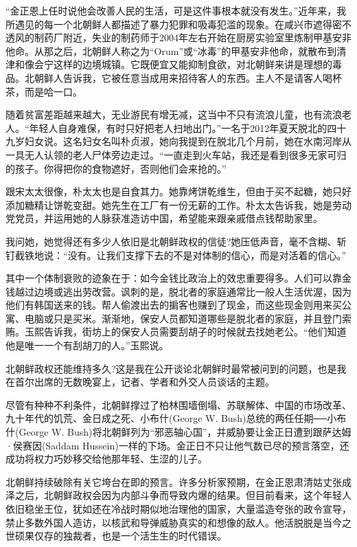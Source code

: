 “金正恩上任时说他会改善人民的生活，可是这件事根本就没有发生。”近年来，我所遇见的每一个北朝鲜人都描述了暴力犯罪和吸毒犯滥的现象。在咸兴市遮得密不透风的制药厂附近，失业的制药师于2004年左右开始在厨房实验室里炼制甲基安非他命。从那之后，北朝鲜人称之为“Orum”或“冰毒”的甲基安非他命，就散布到清津和像会宁这样的边境城镇。它既便宜又能抑制食欲，对北朝鲜来讲是理想的毒品。北朝鲜人告诉我，它被任意当成用来招待客人的东西。主人不是请客人喝杯茶，而是哈一口。

随着贫富差距越来越大，无业游民有增无减，这当中不只有流浪儿童，也有流浪老人。“年轻人自身难保，有时只好把老人扫地出门。”一名于2012年夏天脱北的四十九岁妇女说。这名妇女名叫朴贞淑，她向我提到在脱北几个月前，她在水南河岸从一具无人认领的老人尸体旁边走过。“一直走到火车站，我还是看到很多无家可归的孩子。你得把你的食物遮好，否则他们会来抢的。”

跟宋太太很像，朴太太也是自食其力。她靠烤饼乾维生，但由于买不起糖，她只好添加糖精让饼乾变甜。她先生在工厂有一份无薪的工作。朴太太告诉我，她是劳动党党员，并运用她的人脉获准造访中国，希望能来跟亲戚借点钱帮助家里。

我问她，她觉得还有多少人依旧是北朝鲜政权的信徒?她压低声音，毫不含糊、斩钉截铁地说：“没有。让我们支撑下去的不是对体制的信心，而是对活着的信心。”

其中一个体制衰败的迹象在于：如今金钱比政治上的效忠重要得多。人们可以靠金钱越过边境或逃出劳改营。讽刺的是，脱北者的家庭通常比一般人生活优渥，因为他们有韩国送来的钱。帮人偷渡出去的掮客也赚到了现金，而这些现金则用来买公寓、电脑或只是买米。渐渐地，保安人员都知道哪些是脱北者的家庭，并且登门索贿。玉熙告诉我，街坊上的保安人员需要刮胡子的时候就去找她老公。“他们知道他是唯一一个有刮胡刀的人。”玉熙说。

北朝鲜政权还能维持多久?这是我在公开谈论北朝鲜时最常被问到的问题，也是我在首尔出席的无数晚宴上，记者、学者和外交人员谈话的主题。

尽管有种种不利条件，北朝鲜撑过了柏林围墙倒塌、苏联解体、中国的市场改革、九十年代的饥荒、金日成之死、小布什(George W. Bush)总统的两任任期──小布什(George W. Bush)将北朝鲜列为“邪恶轴心国”，并威胁要让金正日遭到跟萨达姆·侯赛因(Saddam Hussein)一样的下场。金正日不只让他气数已尽的预言落空，还成功将权力巧妙移交给他那年轻、生涩的儿子。

北朝鲜持续破除有关它垮台在即的预言。许多分析家预期，在金正恩肃清姑丈张成泽之后，北朝鲜政权会因为内部斗争而导致内爆的结果。但目前看来，这个年轻人依旧稳坐王位，犹如还在冷战时期似地治理他的国家，大量滥造夸张的政令宣导，禁止多数外国人造访，以核武和导弹威胁真实的和想像的敌人。他活脱脱是当今之世硕果仅存的独裁者，也是一个活生生的时代错误。


